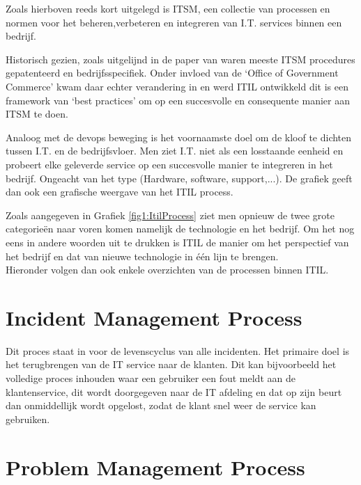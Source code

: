 \documentclass{article}
\begin{document}
	Zoals hierboven reeds kort uitgelegd is ITSM, een collectie van processen en normen voor het beheren,verbeteren en integreren van I.T. services binnen een bedrijf.\\ 
	
	\par
	\noindent
	Historisch gezien, zoals uitgelijnd in de paper van \cite{McNaughton_2010} waren meeste ITSM procedures gepatenteerd en bedrijfsspecifiek. Onder invloed van de ‘Office of Government Commerce’ kwam daar echter verandering in en werd ITIL ontwikkeld dit is een framework van ‘best practices’ om op een succesvolle en consequente manier aan ITSM te doen.\\
	
	\par
	\noindent
	Analoog met de devops beweging is het voornaamste doel om de kloof te dichten tussen I.T. en de bedrijfsvloer. Men ziet I.T. niet als een losstaande eenheid en probeert elke geleverde service op een succesvolle manier te integreren in het bedrijf. Ongeacht van het type (Hardware, software, support,...). De grafiek geeft dan ook een grafische weergave van het ITIL  process.\\
	
	\par
	\noindent
	Zoals aangegeven in Grafiek \ref{fig1:ItilProcess} ziet men opnieuw de twee grote categorieën naar voren komen namelijk de technologie en het bedrijf. Om het nog eens in andere woorden uit te drukken is ITIL de manier om het perspectief van het bedrijf en dat van nieuwe technologie in één lijn te brengen.\\
	
	\noindent
	Hieronder volgen dan ook enkele overzichten van de processen binnen ITIL.
	
	\section{Incident Management Process}
	
	Dit proces staat in voor de levenscyclus van alle incidenten. Het primaire doel is het terugbrengen van de IT service naar de klanten. Dit kan bijvoorbeeld het volledige proces inhouden waar een gebruiker een fout meldt aan de klantenservice, dit wordt doorgegeven naar de IT afdeling en dat op zijn beurt dan onmiddellijk wordt opgelost, zodat de klant snel weer de service kan gebruiken.
	
	\section{Problem Management Process}
	
\end{document}
